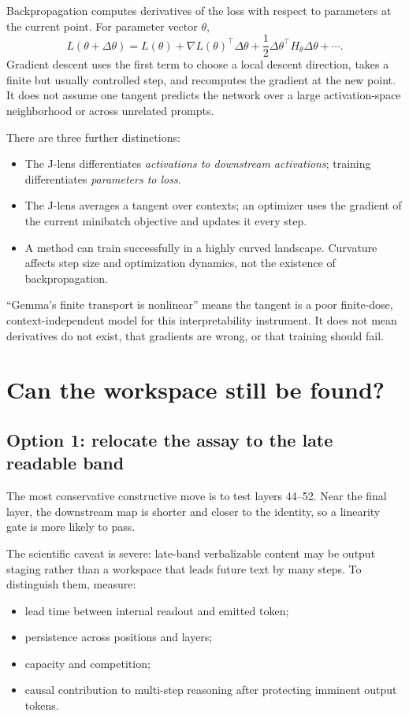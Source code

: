 \documentclass[11pt]{article}
\theoremstyle{definition}
\theoremstyle{remark}
\begin{document}
Backpropagation computes derivatives of the loss with respect to parameters at the current point. For parameter vector $\theta$,
\begin{equation}
  L(\theta+\Delta\theta)
  =L(\theta)+\nabla L(\theta)^\top\Delta\theta+
  \frac{1}{2}\Delta\theta^\top H_\theta\Delta\theta+\cdots.
\end{equation}
Gradient descent uses the first term to choose a local descent direction, takes a finite but usually controlled step, and recomputes the gradient at the new point. It does not assume one tangent predicts the network over a large activation-space neighborhood or across unrelated prompts.

There are three further distinctions:
\begin{itemize}
  \item The J-lens differentiates \emph{activations to downstream activations}; training differentiates \emph{parameters to loss}.
  \item The J-lens averages a tangent over contexts; an optimizer uses the gradient of the current minibatch objective and updates it every step.
  \item A method can train successfully in a highly curved landscape. Curvature affects step size and optimization dynamics, not the existence of backpropagation.
\end{itemize}

\begin{takeawaybox}
``Gemma's finite transport is nonlinear'' means the tangent is a poor finite-dose, context-independent model for this interpretability instrument. It does not mean derivatives do not exist, that gradients are wrong, or that training should fail.
\end{takeawaybox}

\section{Can the workspace still be found?}

\subsection{Option 1: relocate the assay to the late readable band}
The most conservative constructive move is to test layers 44--52. Near the final layer, the downstream map is shorter and closer to the identity, so a linearity gate is more likely to pass.

The scientific caveat is severe: late-band verbalizable content may be output staging rather than a workspace that leads future text by many steps. To distinguish them, measure:
\begin{itemize}
  \item lead time between internal readout and emitted token;
  \item persistence across positions and layers;
  \item capacity and competition;
  \item causal contribution to multi-step reasoning after protecting imminent output tokens.
\end{itemize}
\end{document}
